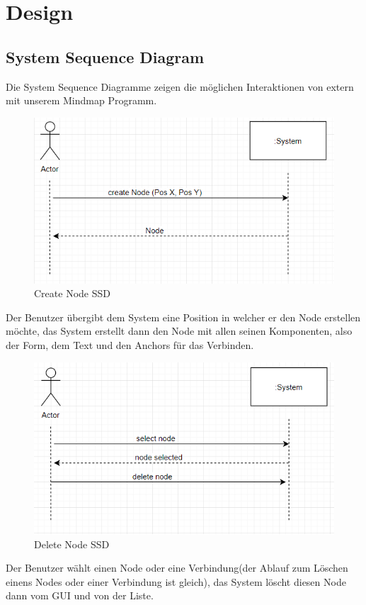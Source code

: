 \chapter{Design}
\label{chap:design}

\section{System Sequence Diagram}
\label{sec:system_sequence_diagramm}
Die System Sequence Diagramme zeigen die möglichen Interaktionen 
von extern mit unserem Mindmap Programm.

\begin{figure}[H]
	\centering
		\includegraphics[scale=0.7]{images/createnode.PNG}
	\caption{Create Node SSD}
	\label{fig:create_node_ssd}
\end{figure}

Der Benutzer übergibt dem System eine Position in welcher er den Node erstellen möchte, das System
erstellt dann den Node mit allen seinen Komponenten, also der Form, dem Text und den Anchors für das
Verbinden.

\begin{figure}[H]
	\centering
		\includegraphics[scale=0.7]{images/deletenode.PNG}
	\caption{Delete Node SSD}
	\label{fig:delete_node_ssd}
\end{figure}
Der Benutzer wählt einen Node oder eine Verbindung(der Ablauf zum Löschen einens Nodes oder einer Verbindung ist gleich), das System löscht diesen Node dann vom GUI und von der Liste. 

